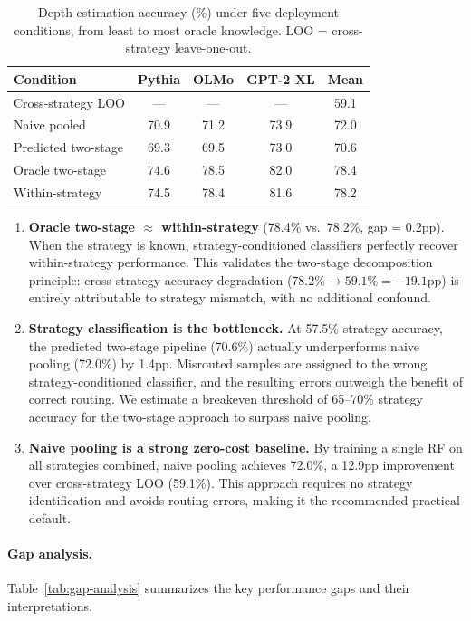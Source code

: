 \documentclass[11pt,a4paper]{article}
\newcommand{\pp}{\mathrm{pp}}
\begin{document}
\begin{table}[t]
\centering
\caption{Depth estimation accuracy (\%) under five deployment conditions, from least to most oracle knowledge. LOO = cross-strategy leave-one-out.}
\label{tab:accuracy-ladder}
\begin{tabular}{lcccc}
\toprule
\textbf{Condition} & \textbf{Pythia} & \textbf{OLMo} & \textbf{GPT-2 XL} & \textbf{Mean} \\
\midrule
Cross-strategy LOO & --- & --- & --- & 59.1 \\
Naive pooled & 70.9 & 71.2 & 73.9 & 72.0 \\
Predicted two-stage & 69.3 & 69.5 & 73.0 & 70.6 \\
Oracle two-stage & 74.6 & 78.5 & 82.0 & 78.4 \\
Within-strategy & 74.5 & 78.4 & 81.6 & 78.2 \\
\bottomrule
\end{tabular}
\end{table}

\begin{enumerate}
    \item \textbf{Oracle two-stage $\approx$ within-strategy} (78.4\% vs.\ 78.2\%, gap = 0.2pp). When the strategy is known, strategy-conditioned classifiers perfectly recover within-strategy performance. This validates the two-stage decomposition principle: cross-strategy accuracy degradation ($78.2\% \to 59.1\% = -19.1\pp$) is entirely attributable to strategy mismatch, with no additional confound.

    \item \textbf{Strategy classification is the bottleneck.} At 57.5\% strategy accuracy, the predicted two-stage pipeline (70.6\%) actually underperforms naive pooling (72.0\%) by 1.4pp. Misrouted samples are assigned to the wrong strategy-conditioned classifier, and the resulting errors outweigh the benefit of correct routing. We estimate a breakeven threshold of 65--70\% strategy accuracy for the two-stage approach to surpass naive pooling.

    \item \textbf{Naive pooling is a strong zero-cost baseline.} By training a single RF on all strategies combined, naive pooling achieves 72.0\%, a 12.9pp improvement over cross-strategy LOO (59.1\%). This approach requires no strategy identification and avoids routing errors, making it the recommended practical default.
\end{enumerate}

\paragraph{Gap analysis.} Table~\ref{tab:gap-analysis} summarizes the key performance gaps and their interpretations.
\end{document}
